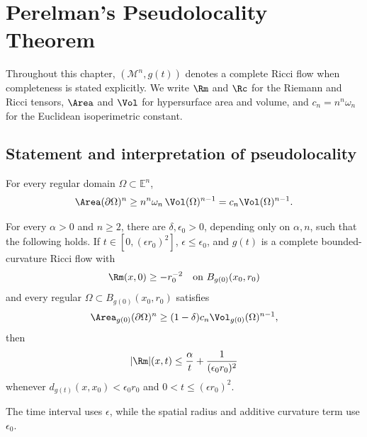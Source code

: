 \chapter[21]{Perelman's Pseudolocality Theorem}
\label{ch:chow-iii-perelmans-pseudolocality}

Throughout this chapter, \((\mathcal M^n,g(t))\) denotes a complete Ricci flow
when completeness is stated explicitly.  We write \(\Rm\) and \(\Rc\) for the
Riemann and Ricci tensors, \(\Area\) and \(\Vol\) for hypersurface area and
volume, and \(c_n=n^n\omega_n\) for the Euclidean isoperimetric constant.

\section{Statement and interpretation of pseudolocality}

\begin{proposition}
\label{prop:chow-iii-euclidean-isoperimetric}
For every regular domain \(\Omega\subset\mathbb E^n\),
\[
  \Area(\partial\Omega)^n\ge n^n\omega_n\,\Vol(\Omega)^{n-1}=c_n\Vol(\Omega)^{n-1}.
\]
\end{proposition}

\begin{theorem}
\label{thm:chow-iii-perelman-pseudolocality}
For every \(\alpha>0\) and \(n\ge2\), there are \(\delta,\epsilon_0>0\),
depending only on \(\alpha,n\), such that the following holds.  If
\(t\in[0,(\epsilon r_0)^2]\), \(\epsilon\le\epsilon_0\), and \(g(t)\) is a
complete bounded-curvature Ricci flow with
\[
\Rm(x,0)\ge-r_0^{-2}\quad\text{on }B_{g(0)}(x_0,r_0)
\]
and every regular \(\Omega\subset B_{g(0)}(x_0,r_0)\) satisfies
\[
\Area_{g(0)}(\partial\Omega)^n\ge(1-\delta)c_n\Vol_{g(0)}(\Omega)^{n-1},
\]
then
\[
|\Rm|(x,t)\le\frac{\alpha}{t}+\frac1{(\epsilon_0r_0)^2}
\]
whenever \(d_{g(t)}(x,x_0)<\epsilon_0r_0\) and
\(0<t\le(\epsilon r_0)^2\).
\end{theorem}

\begin{remark}
\label{rem:chow-iii-pseudolocality-scales}
The time interval uses \(\epsilon\), while the spatial radius and additive
curvature term use \(\epsilon_0\).
\end{remark}


